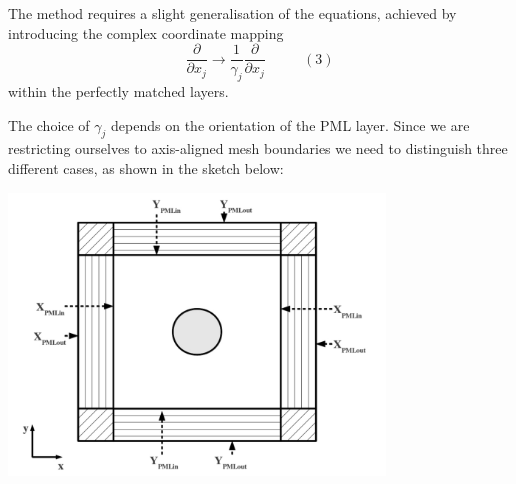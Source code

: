 The method requires a slight generalisation of the equations, achieved by introducing the complex coordinate mapping \[ \frac{\partial}{\partial x_j} \to \frac{1}{\gamma_j} \frac{\partial}{\partial x_j} \ \ \ \ \ \ \ \ \ \ \ \ (3) \] within the perfectly matched layers.

The choice of $ \gamma_j $ depends on the orientation of the P\+ML layer. Since we are restricting ourselves to axis-\/aligned mesh boundaries we need to distinguish three different cases, as shown in the sketch below\+:

 
\begin{DoxyImage}
\includegraphics[width=0.75\textwidth]{PMLDomain}
\end{DoxyImage}


